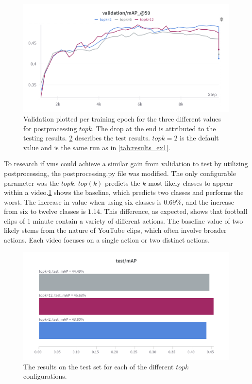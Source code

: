 \begin{figure}[h]
    \centering
    \includegraphics[width=\linewidth]{figures/valid_topk_2.png}
    \caption{Validation plotted per training epoch for the three different values for postprocessing $topk$. The drop at the end is attributed to the testing results. \cref{fig:topk_test_map} describes the test results. \(topk=2\) is the default value and is the same run as in \cref{tab:results_ex1}.}
    \label{fig:topk}
\end{figure}

To research if \acrshort{vms} could achieve a similar gain from validation to test by utilizing postprocessing, the postprocessing.py file was modified. The only configurable parameter was the $topk$. $top (k)$ predicts the $k$ most likely classes to appear within a video.\cref{fig:topk} shows the baseline, which predicts two classes and performs the worst. The increase in value when using six classes is $0.69\%$, and the increase from six to twelve classes is $1.14$. This difference, as expected, shows that football clips of 1 minute contain a variety of different actions. The baseline value of two likely stems from the nature of YouTube clips, which often involve broader actions. Each video focuses on a single action or two distinct actions. 

\begin{figure}
    \centering
    \includegraphics[width=\linewidth]{figures/topk_test_map.png}
    \caption{The results on the test set for each of the different $topk$ configurations. }
    \label{fig:topk_test_map}
\end{figure}


